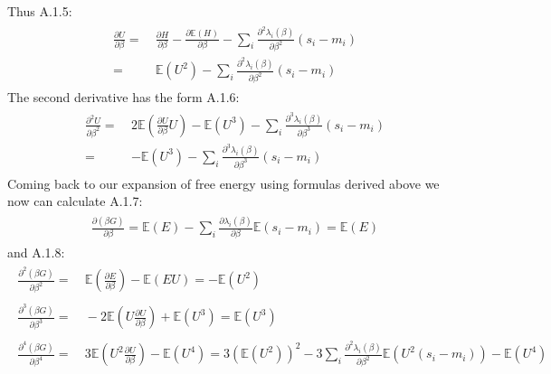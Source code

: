 \documentclass[../report/report.tex]{subfiles}
\begin{document}
Thus A.1.5:
\begin{align}
\begin{split}
\frac{\partial U}{\partial \beta}  =  ~&\frac{\partial H}{\partial \beta} - \frac{\partial \mathbb{E}(H)}{\partial \beta} - \sum_i \frac{\partial^2 \lambda_i (\beta)}{\partial \beta^2} (s_i - m_i)\\
= ~& \mathbb{E}(U^2) - \sum_i \frac{\partial^2 \lambda_i (\beta)}{\partial \beta^2} (s_i - m_i)
\end{split}
\end{align}
The second derivative has the form A.1.6:
\begin{align}
\begin{split}
\frac{\partial^2 U}{\partial \beta^2}  =  ~& 2 \mathbb{E}\left(\frac{\partial U}{\partial \beta}U  \right) - \mathbb{E}(U^3) - \sum_i \frac{\partial^3 \lambda_i (\beta)}{\partial \beta^3} (s_i - m_i) \\
= ~& - \mathbb{E}(U^3) - \sum_i \frac{\partial^3 \lambda_i (\beta)}{\partial \beta^3} (s_i - m_i)
\end{split}
\end{align}
Coming back to our expansion of free energy using formulas derived above we now can calculate A.1.7:
\begin{align}
\begin{split}
 \frac{\partial (\beta G)}{\partial \beta} = \mathbb{E}(E) - \sum_i \frac{\partial\lambda_i (\beta)}{\partial \beta}\mathbb{E}(s_i - m_i) = \mathbb{E}(E) 
\end{split}
\end{align}
and A.1.8:
\begin{align}
\begin{split}
 \frac{\partial^2 (\beta G)}{\partial \beta^2} = &~ \mathbb{E}\left( \frac{\partial E}{\partial \beta} \right) - \mathbb{E}(EU) = - \mathbb{E}(U^2)\\
\\
 \frac{\partial^3 (\beta G)}{\partial \beta^3}= &~ - 2\mathbb{E}\left( U \frac{\partial U}{\partial \beta} \right) + \mathbb{E}(U^3)  = \mathbb{E}(U^3)  \\
 \\
  \frac{\partial^4 (\beta G)}{\partial \beta^4}= &~ 3\mathbb{E}\left( U^2 \frac{\partial U}{\partial \beta} \right) - \mathbb{E}(U^4)  = 3\left(\mathbb{E}(U^2)\right)^2 -3\sum_i \frac{\partial^2 \lambda_i (\beta)}{\partial \beta^2}\mathbb{E}(U^2(s_i-m_i))- \mathbb{E}(U^4) 
  \label{eq:higherOrders}
\end{split}
\end{align}
\end{document}
